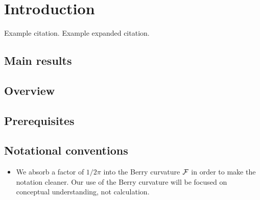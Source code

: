 \chapter{Introduction}

Example citation.\cite{Foncesca-Vaidya_nonorientable} Example expanded citation.\parencite[Remark 3.8]{Mathai_math-review}

\section{Main results}

\section{Overview}

\section{Prerequisites}

\section{Notational conventions}

{\color{blue}
\begin{itemize}
	\item We absorb a factor of $1/2\pi$ into the Berry curvature $\mathcal{F}$ in order to make the notation cleaner. Our use of the Berry curvature will be focused on conceptual understanding, not calculation.
\end{itemize}
}